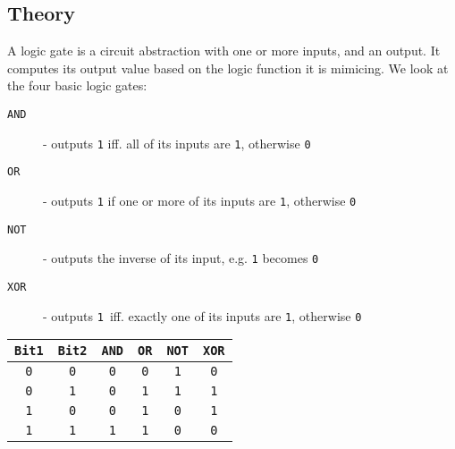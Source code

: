\documentclass{beamer}
\renewcommand{\tt}{\texttt}
\begin{document}
\subsection{Theory}
\begin{frame}
    A logic gate is a circuit abstraction with one or more inputs, and an
    output. It computes its output value based on the logic function it is
    mimicing. We look at the four basic logic gates:
    \begin{description}
        \item[\tt{AND}] - outputs \tt{1} iff. all of its inputs are \tt{1},
            otherwise \tt{0}
        \item[\tt{OR}] - outputs \tt{1} if one or more of its inputs are
            \tt{1}, otherwise \tt{0}
        \item[\tt{NOT}] - outputs the inverse of its input, e.g. \tt{1} becomes
            \tt{0}
        \item[\tt{XOR}] - outputs \tt{1} iff. exactly one of its inputs are
            \tt{1}, otherwise \tt{0}
    \end{description}
\end{frame}
\begin{frame}
    \begin{center}
        \begin{tabular}{cc|cccc}
            \hline
            \tt{Bit1} & \tt{Bit2} & \tt{AND} & \tt{OR} & \tt{NOT} & \tt{XOR} \\
            \hline
            \tt{0} & \tt{0} & \tt{0} & \tt{0} & \tt{1} & \tt{0} \\
            \tt{0} & \tt{1} & \tt{0} & \tt{1} & \tt{1} & \tt{1} \\
            \tt{1} & \tt{0} & \tt{0} & \tt{1} & \tt{0} & \tt{1} \\
            \tt{1} & \tt{1} & \tt{1} & \tt{1} & \tt{0} & \tt{0} \\
            \hline
        \end{tabular}
    \end{center}
\end{frame}
\end{document}

